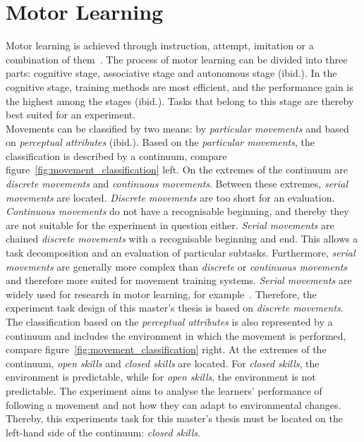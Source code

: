 \section{Motor Learning}
\label{section:motor_learning}
Motor learning is achieved through instruction, attempt, imitation or a combination of them~\cite{mlbook}. The process of motor learning can be divided into three parts: cognitive stage, associative stage and autonomous stage (ibid.). In the cognitive stage, training methods are most efficient, and the performance gain is the highest among the stages (ibid.). Tasks that belong to this stage are thereby best suited for an experiment.\\
Movements can be classified by two means: by \textit{particular movements} and based on \textit{perceptual attributes} (ibid.). Based on the \textit{particular movements}, the classification is described by a continuum, compare figure~\ref{fig:movement_classification} left. On the extremes of the continuum are \textit{discrete movements} and \textit{continuous movements}. Between these extremes, \textit{serial movements} are located. \textit{Discrete movements} are too short for an evaluation. \textit{Continuous movements} do not have a recognisable beginning, and thereby they are not suitable for the experiment in question either. \textit{Serial movements} are chained \textit{discrete movements} with a recognisable beginning and end. This allows a task decomposition and an evaluation of particular subtasks. Furthermore, \textit{serial movements} are generally more complex than \textit{discrete} or \textit{continuous movements} and therefore more suited for movement training systems. \textit{Serial movements} are widely used for research in motor learning, for example~\cite{lightguide,mythaichicoaches,elearningma}. Therefore, the experiment task design of this master's thesis is based on \textit{discrete movements}.\\
The classification based on the \textit{perceptual attributes} is also represented by a continuum and includes the environment in which the movement is performed, compare figure~\ref{fig:movement_classification} right. At the extremes of the continuum, \textit{open skills} and \textit{closed skills} are located. For \textit{closed skills}, the environment is predictable, while for\textit{ open skills}, the environment is not predictable. The experiment aims to analyse the learners' performance of following a movement and not how they can adapt to environmental changes. Thereby, this experiments task for this master's thesis must be located on the left-hand side of the continuum: \textit{closed skills}.
